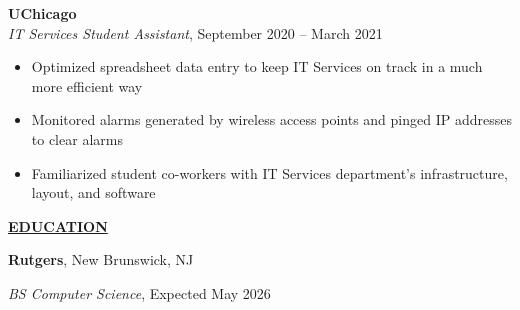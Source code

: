 \documentclass[
]{article}
\providecommand{\tightlist}{%
  \setlength{\itemsep}{0pt}\setlength{\parskip}{0pt}}
\begin{document}
\textbf{UChicago}\\
\emph{IT Services Student Assistant}, September %
2020 -- March %
2021

\begin{itemize}
\tightlist
\item
  Optimized spreadsheet data entry to keep IT Services on track in a
  much more efficient way
\end{itemize}

\begin{itemize}
\item
  Monitored alarms generated by wireless access points and pinged IP
  addresses to clear alarms
\item
  Familiarized student co-workers with IT Services department's
  infrastructure, layout, and software
\end{itemize}






\textbf{\underline{EDUCATION}}

\textbf{Rutgers}, New Brunswick, NJ

\emph{BS Computer Science}, Expected May 2026
\end{document}

